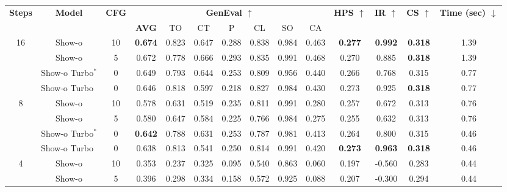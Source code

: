 \begin{table*}[t]
    \centering
    \setlength{\tabcolsep}{4pt}
    \begin{tabular}{ccc|ccccccc|ccc|c}
        \toprule
        \multirow{2}{*}{\textbf{\small Steps}} & \multirow{2}{*}{\textbf{\small Model}} & \multirow{2}{*}{\textbf{\small CFG}} & \multicolumn{7}{c|}{\textbf{\small GenEval \large$\uparrow$}} & \multirow{2}{*}{\textbf{\small HPS \large$\uparrow$}} & \multirow{2}{*}{\textbf{\small IR \large$\uparrow$}} & \multirow{2}{*}{\textbf{\small CS \large$\uparrow$}} & \multirow{2}{*}{\textbf{\small Time (sec) \large$\downarrow$}} \\
        \cmidrule(lr){4-10}
         &  &  & \textbf{\small AVG} & {\small TO} & {\small CT} & {\small P} & {\small CL} & {\small SO} & {\small CA} &  &  &  &  \\
        \midrule
        \multirow{4}{*}{16} & Show-o & 10 & \textbf{0.674} & 0.823 & 0.647 & 0.288 & 0.838 & 0.984 & 0.463 & \textbf{0.277} & \textbf{0.992} & \textbf{0.318} & 1.39 \\
         & Show-o & 5 & 0.672 & 0.778 & 0.666 & 0.293 & 0.835 & 0.991 & 0.468 & 0.270 & 0.885 & \textbf{0.318} & 1.39 \\
         & Show-o Turbo$^*$ & 0 & 0.649 & 0.793 & 0.644 & 0.253 & 0.809 & 0.956 & 0.440 & 0.266 & 0.768 & 0.315 & 0.77 \\
         & Show-o Turbo$\;\,$ & 0 & 0.646 & 0.818 & 0.597 & 0.218 & 0.827 & 0.984 & 0.430 & 0.273 & 0.925 & \textbf{0.318} & 0.77 \\
        \midrule
        \multirow{4}{*}{8} & Show-o & 10 & 0.578 & 0.631 & 0.519 & 0.235 & 0.811 & 0.991 & 0.280 & 0.257 & 0.672 & 0.313 & 0.76 \\
         & Show-o & 5 & 0.580 & 0.647 & 0.584 & 0.225 & 0.766 & 0.984 & 0.275 & 0.255 & 0.632 & 0.313 & 0.76 \\
         & Show-o Turbo$^*$ & 0 & \textbf{0.642} & 0.788 & 0.631 & 0.253 & 0.787 & 0.981 & 0.413 & 0.264 & 0.800 & 0.315 & 0.46 \\
         & Show-o Turbo$\;\,$ & 0 & 0.638 & 0.813 & 0.541 & 0.250 & 0.814 & 0.991 & 0.420 & \textbf{0.273} & \textbf{0.963} & \textbf{0.318} & 0.46 \\
        \midrule
        \multirow{4}{*}{4} & Show-o & 10 & 0.353 & 0.237 & 0.325 & 0.095 & 0.540 & 0.863 & 0.060 & 0.197 & -0.560 & 0.283 & 0.44 \\
         & Show-o & 5 & 0.396 & 0.298 & 0.334 & 0.158 & 0.572 & 0.925 & 0.088 & 0.207 & -0.300 & 0.294 & 0.44 \\

\end{tabular}
\end{table*}
